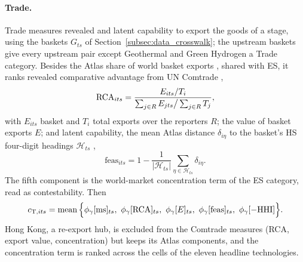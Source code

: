 \paragraph{Trade.}\label{subsec:eo_trade} Trade measures revealed and latent capability to export
the goods of a stage, using the baskets $G_{ts}$ of Section~\ref{subsec:data_crosswalk}; the
upstream baskets give every upstream pair except Geothermal and Green Hydrogen a Trade category. Besides the Atlas
share of world basket exports \citep{growthlab2019trade}, shared with ES, it ranks revealed
comparative advantage \citep{balassa1965trade} from UN Comtrade \citep{uncomtrade},
\begin{equation}\label{eq:eo_rca}
  \mathrm{RCA}_{its}=\frac{E_{its}/T_i}{\sum_{j\in R}E_{jts}\big/\sum_{j\in R}T_j},
\end{equation}
with $E_{its}$ basket and $T_i$ total exports over the reporters $R$; the value of basket exports
$E$; and latent capability, the mean Atlas distance $\delta_{i\eta}$ to the basket's HS four-digit
headings $\mathcal H_{ts}$ \citep{hidalgo2007product},
\begin{equation}\label{eq:eo_feas}
  \mathrm{feas}_{its}=1-\frac{1}{|\mathcal H_{ts}|}\sum_{\eta\in\mathcal H_{ts}}\delta_{i\eta}.
\end{equation}
The fifth component is the world-market concentration term of the ES category, read as
contestability. Then
\begin{equation}\label{eq:eo_trade}
  c_{\mathrm{T},its}=\mean\Big\{\Scurve[\mathrm{ms}]_{ts},\ \Scurve[\RCA]_{ts},\
  \Scurve[E]_{ts},\ \Scurve[\mathrm{feas}]_{ts},\ \Scurve[-\HHI]\Big\}.
\end{equation}
Hong Kong, a re-export hub, is excluded from the Comtrade measures (RCA, export value,
concentration) but keeps its Atlas components, and the concentration term is ranked across the
cells of the eleven headline technologies.

